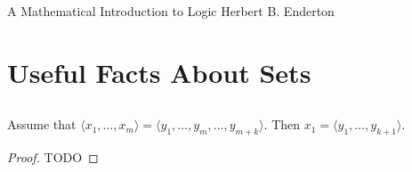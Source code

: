 \documentclass{report}
\begin{document}
\header
  {A Mathematical Introduction to Logic}
  {Herbert B. Enderton}

\tableofcontents

\setcounter{chapter}{0}
\addtocounter{chapter}{-1}

\chapter{Useful Facts About Sets}%
\label{chap:useful-facts-about-sets}

\section{}%
\label{sec:lemma-0a}

Assume that $\langle x_1, \ldots, x_m \rangle =
  \langle y_1, \ldots, y_m, \ldots, y_{m+k} \rangle$.
Then $x_1 = \langle y_1, \ldots, y_{k+1} \rangle$.

\begin{proof}

  TODO

\end{proof}
\end{document}
